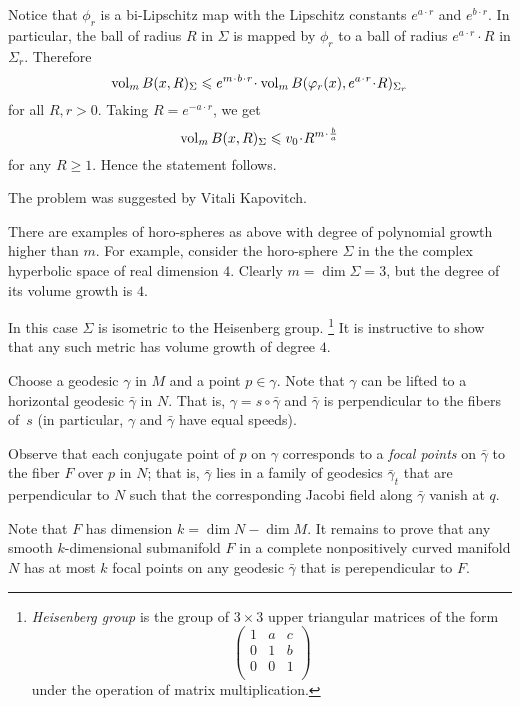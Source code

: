 Notice that $\phi_r$ is a bi-Lipschitz map with the Lipschitz constants $e^{a\cdot r}$ and $e^{b\cdot r}$.
In particular, the ball of radius $R$ in $\Sigma$ is mapped by $\phi_r$
to a ball of radius $e^{a\cdot r}\cdot R$ in $\Sigma_r$.
Therefore
\[\vol_m B(x,R)_\Sigma
\le 
e^{m\cdot b\cdot r}\cdot \vol_m B(\phi_r(x),e^{a\cdot r}\cdot R)_{\Sigma_r}\]
for all $R,r>0$.
Taking $R=e^{-a\cdot r}$, we get
\[\vol_m B(x,R)_\Sigma\le v_0\cdot R^{m\cdot \frac ba}\]
for any $R\ge1$. 
Hence the statement follows.
\qeds

The problem was suggested by Vitali Kapovitch.

There are examples of horo-spheres as above with degree of polynomial growth higher than $m$.
For example, consider the horo-sphere $\Sigma$ in the
the complex hyperbolic space 
of real dimension $4$.
Clearly $m=\dim \Sigma=3$, but the degree of its volume growth is $4$.

In this case $\Sigma$ is isometric to the Heisenberg group.%
\footnote{\emph{Heisenberg group}
is the group of $3\times3$ upper triangular matrices of the form
\[\begin{pmatrix}
 1 & a & c\\
 0 & 1 & b\\
 0 & 0 & 1\\
\end{pmatrix}\]
under the operation of matrix multiplication.} 
It is instructive to show that any such metric has volume  growth of degree $4$.

Choose a geodesic $\gamma$ in $M$ and a point $p\in \gamma$.
Note that $\gamma$ can be lifted to a horizontal geodesic $\bar\gamma$ in $N$.
That is, $\gamma=s\circ\bar\gamma$ and $\bar\gamma$ is perpendicular to the fibers of~$s$ (in particular, $\gamma$ and $\bar\gamma$ have equal speeds).

Observe that each conjugate point of $p$ on $\gamma$ corresponds to a \emph{focal points} on $\bar\gamma$ to the fiber $F$ over $p$ in $N$;
that is, $\bar\gamma$ lies in a family of geodesics $\bar\gamma_t$ that are perpendicular to $N$ 
such that the corresponding Jacobi field along $\bar\gamma$ vanish at $q$.

Note that $F$ has dimension $k=\dim N-\dim M$.
It remains to prove that any smooth $k$-dimensional submanifold $F$ in a complete nonpositively curved manifold $N$ has at most $k$ focal points on any geodesic $\bar \gamma$ that is perependicular to $F$.\qeds

